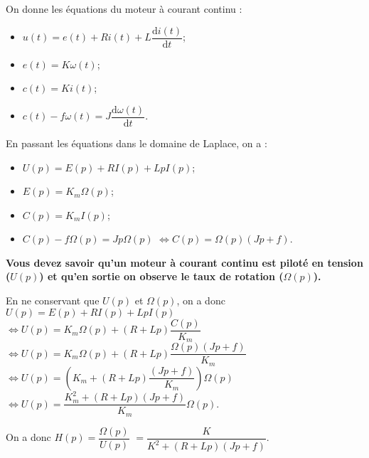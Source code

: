 \normaltrue \difficilefalse \tdifficilefalse
\correctiontrue


\setcounter{question}{0}
\ifcorrection
\else
{}
\fi


\ifprof 
\else
On donne les équations du moteur à courant continu :
\begin{itemize}
\item $u(t) = e(t)+ Ri(t) +L \dfrac{\text{d}i(t)}{\text{d} t}$;
\item $e(t)=K\omega(t)$;
\item $c(t)=Ki(t)$;
\item $c(t)- f\omega(t)=J\dfrac{\text{d}\omega(t)}{\text{d} t}$.
\end{itemize}
\fi

\ifprof
En passant les équations dans le domaine de Laplace, on a : 
\begin{itemize}
\item $U(p) = E(p)+ RI(p) +LpI(p)$;
\item $E(p)=K_m\Omega(p)$;
\item $C(p)=K_mI(p)$;
\item $C(p)- f\Omega(p)=Jp\Omega(p)$ $\Leftrightarrow C(p)=\Omega(p)\left( Jp +f \right)$.
\end{itemize}

\textbf{Vous devez savoir qu'un moteur à courant continu est piloté en tension ($U(p)$) et qu'en sortie on observe le taux de rotation ($\Omega(p)$). }

En ne conservant que $U(p)$ et $\Omega(p)$, on a donc
$U(p) = E(p)+ RI(p) +LpI(p)$
$ \Leftrightarrow U(p) = K_m\Omega(p)+ \left(R +Lp\right)\dfrac{C(p)}{K_m}$
$ \Leftrightarrow U(p) = K_m\Omega(p)+ \left(R +Lp\right)\dfrac{\Omega(p)\left( Jp +f \right)}{K_m}$
$ \Leftrightarrow U(p) = \left(K_m+ \left(R +Lp\right)\dfrac{\left( Jp +f \right)}{K_m}\right)\Omega(p)$
$ \Leftrightarrow U(p) =  \dfrac{K_m^2 + \left(R +Lp\right)\left( Jp +f \right)}{K_m}\Omega(p)$.

On a donc $H(p)=\dfrac{\Omega(p)}{U(p)}$ $=\dfrac{K}{K^2 +\left(R +Lp\right) \left( Jp +f \right)} $.

\else
\fi

